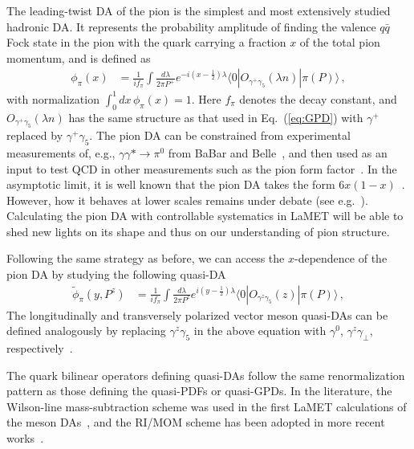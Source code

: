 \documentclass[aps,rmp,reprint,amsmath,amssymb,graphicx,longbibliography]{revtex4-1} %
\begin{document}
The leading-twist DA of the pion is the simplest and most extensively studied hadronic DA. It represents the probability amplitude of finding the valence $q\bar q$ Fock state in the pion with the quark carrying a fraction $x$ of the total pion momentum, and is defined as
\begin{align}\label{eq:pionDA}
	\phi_{\pi}(x)&={\frac{1}{if_{\pi}}}\int \frac{d\lambda}{2\pi P^+}e^{-i (x-\frac 1 2)\lambda}\langle 0|O_{\gamma^+\gamma_5}(\lambda n)|\pi(P)\rangle\,,
\end{align}
with normalization $\int_0^1 dx\, \phi_\pi(x)=1$. Here $f_\pi$ denotes the decay constant, and
$O_{\gamma^+\gamma_5}(\lambda n)$ has the same structure as that used in Eq.~(\ref{eq:GPD}) with $\gamma^+$ replaced by $\gamma^+\gamma_5$. The pion DA can be constrained from experimental measurements of, e.g.,
$\gamma \gamma* \rightarrow \pi^0$ from BaBar and Belle~\cite{Aubert:2009mc,Uehara:2012ag},
and then used as an input to test QCD in other measurements such as the pion form factor~\cite{Efremov:1978rn,Farrar:1979aw}.
In the asymptotic limit, it is well known that the pion DA takes the form
$6 x(1-x)$~\cite{Efremov:1978rn,Lepage:1979zb}.
However, how it behaves at lower scales remains under debate (see e.g.~\cite{Chernyak:1981zz}).
%
Calculating the pion DA with controllable systematics in LaMET will be able to shed new lights on its shape and thus on our understanding of pion structure.


Following the same strategy as before, we can access the $x$-dependence of the pion DA by studying the following quasi-DA~\cite{Ji:2015qla,Zhang:2017bzy}
\begin{align}\label{eq:quasiDA}
	\tilde\phi_{\pi}(y, P^z)&={\frac{1}{if_{\pi}}}\int \frac{d\lambda}{2\pi P^z}e^{i (y-\frac 1 2) \lambda}\langle 0|{O}_{\gamma^z\gamma_5}(z)|\pi(P)\rangle\,,
\end{align}
The longitudinally and transversely polarized vector meson quasi-DAs can be defined analogously by replacing $\gamma^z\gamma_5$ in the above equation with $\gamma^0$, $\gamma^z\gamma_\perp$, respectively~\cite{Liu:2018tox}.


The quark bilinear operators defining quasi-DAs follow the same renormalization pattern as those defining the quasi-PDFs or quasi-GPDs.
In the literature, the Wilson-line mass-subtraction scheme was used in the first LaMET calculations of the meson DAs~\cite{Zhang:2017bzy,Chen:2017gck}, and the RI/MOM scheme has been adopted in more recent works~\cite{Zhang:2020gaj}.
\end{document}
